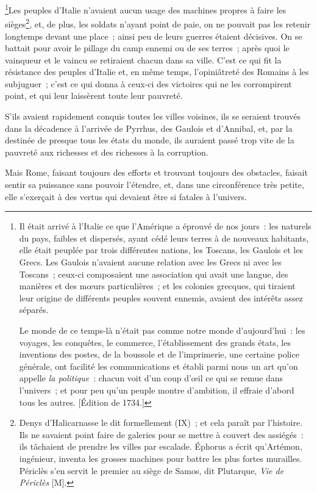 \documentclass[french,twoside]{book} %
\begin{document}
\footnote{ Il était arrivé à l’Italie ce que l’Amérique a éprouvé de nos jours : les naturels du pays, faibles et dispersés, ayant cédé leurs terres à de nouveaux habitants, elle était peuplée par trois différentes nations, les Toscans, les Gaulois et les Grecs. Les Gaulois n’avaient aucune relation avec les Grecs ni avec les Toscans ; ceux-ci composaient une association qui avait une langue, des manières et des mœurs particulières ; et les colonies grecques, qui tiraient leur origine de différents peuples souvent ennemis, avaient des intérêts assez séparés.\par
Le monde de ce temps-là n’était pas comme notre monde d’aujourd’hui : les voyages, les conquêtes, le commerce, l’établissement des grands états, les inventions des postes, de la boussole et de l’imprimerie, une certaine police générale, ont facilité les communications et établi parmi nous un art qu’on appelle {\itshape la politique} : chacun voit d’un coup d’œil ce qui se remue dans l’univers ; et pour peu qu’un peuple montre d’ambition, il effraie d’abord tous les autres. [Édition de 1734.]
}Les peuples d’Italie n’avaient aucun usage des machines propres à faire les sièges\footnote{Denys d’Halicarnasse le dit formellement (IX) ; et cela paraît par l’histoire. Ils ne savaient point faire de galeries pour se mettre à couvert des assiégés : ils tâchaient de prendre les villes par escalade. Éphorus a écrit qu’Artémon, ingénieur, inventa les grosses machines pour battre les plus fortes murailles. Périclès s’en servit le premier au siège de Samos, dit Plutarque, {\itshape Vie de Périclès} [M].}, et, de plus, les soldats n’ayant point de paie, on ne pouvait pas les retenir longtemps devant une place ; ainsi peu de leurs guerres étaient décisives. On se battait pour avoir le pillage du camp ennemi ou de ses terres ; après quoi le vainqueur et le vaincu se retiraient chacun dans sa ville. C’est ce qui fit la résistance des peuples d’Italie et, en même temps, l’opiniâtreté des Romains à les subjuguer ; c’est ce qui donna à ceux-ci des victoires qui ne les corrompirent point, et qui leur laissèrent toute leur pauvreté.\par
S’ils avaient rapidement conquis toutes les villes voisines, ils se seraient trouvés dans la décadence à l’arrivée de Pyrrhus, des Gaulois et d’Annibal, et, par la destinée de presque tous les états du monde, ils auraient passé trop vite de la pauvreté aux richesses et des richesses à la corruption.\par
Mais Rome, faisant toujours des efforts et trouvant toujours des obstacles, faisait sentir sa puissance sans pouvoir l’étendre, et, dans une circonférence très petite, elle s’exerçait à des vertus qui devaient être si fatales à l’univers.\par
\end{document}
